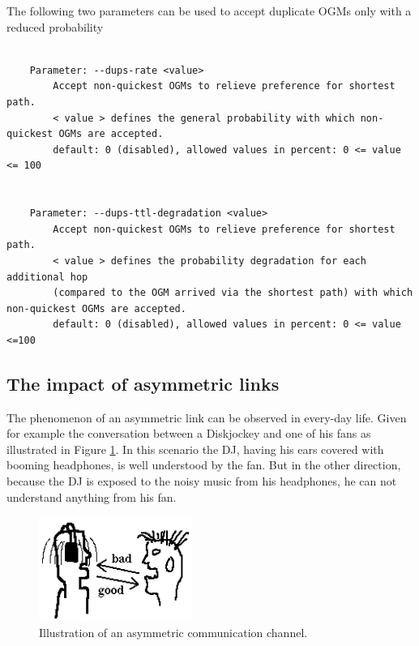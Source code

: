 \documentclass[11pt]{article}
\begin{document}
The following two parameters can be used to accept duplicate OGMs only with a reduced probability


\begin{small}
\begin{verbatim}

    Parameter: --dups-rate <value>
        Accept non-quickest OGMs to relieve preference for shortest path.
        < value > defines the general probability with which non-quickest OGMs are accepted.
        default: 0 (disabled), allowed values in percent: 0 <= value <= 100


    Parameter: --dups-ttl-degradation <value>
        Accept non-quickest OGMs to relieve preference for shortest path.
        < value > defines the probability degradation for each additional hop
        (compared to the OGM arrived via the shortest path) with which non-quickest OGMs are accepted.
        default: 0 (disabled), allowed values in percent: 0 <= value <=100

\end{verbatim}
\end{small}






\subsection{The impact of asymmetric links}
\label{sec:asymmetric-links}

The phenomenon of an asymmetric link can be observed in every-day life. Given for example the conversation between a Diskjockey and one of his fans as illustrated in Figure \ref{fig:asymmetric-link}. In this scenario the DJ, having his ears covered with booming headphones, is well understood by the fan. But in the other direction, because the DJ is exposed to the noisy music from his headphones, he can not understand anything from his fan.

\begin{figure}[htbp]
  \begin{center}
    \includegraphics[width=5cm]{KopfoererTyp-x01-selected.png}
    \caption{Illustration of an asymmetric communication channel.}
    \label{fig:asymmetric-link}
  \end{center}
\end{figure}
\end{document}
